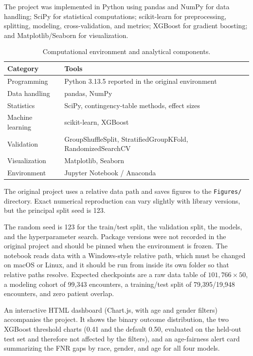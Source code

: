 \documentclass[10pt,a4paper]{article}
\begin{document}
The project was implemented in Python using pandas and NumPy for data handling; SciPy for statistical computations; scikit-learn for preprocessing, splitting, modeling, cross-validation, and metrics; XGBoost for gradient boosting; and Matplotlib/Seaborn for visualization.

\begin{table}[H]
\centering
\caption{Computational environment and analytical components.}
\label{tab:software}
\begin{tabularx}{\textwidth}{lY}
\toprule
Category & Tools\\
\midrule
Programming & Python 3.13.5 reported in the original environment\\
Data handling & pandas, NumPy\\
Statistics & SciPy, contingency-table methods, effect sizes\\
Machine learning & scikit-learn, XGBoost\\
Validation & GroupShuffleSplit, StratifiedGroupKFold, RandomizedSearchCV\\
Visualization & Matplotlib, Seaborn\\
Environment & Jupyter Notebook / Anaconda\\
\bottomrule
\end{tabularx}
\end{table}

The original project uses a relative data path and saves figures to the \texttt{Figures/} directory. Exact numerical reproduction can vary slightly with library versions, but the principal split seed is 123.

The random seed is 123 for the train/test split, the validation split, the models, and the hyperparameter search. Package versions were not recorded in the original project and should be pinned when the environment is frozen. The notebook reads data with a Windows-style relative path, which must be changed on macOS or Linux, and it should be run from inside its own folder so that relative paths resolve. Expected checkpoints are a raw data table of $101{,}766\times 50$, a modeling cohort of 99,343 encounters, a training/test split of 79,395/19,948 encounters, and zero patient overlap.

An interactive HTML dashboard (Chart.js, with age and gender filters) accompanies the project. It shows the binary outcome distribution, the two XGBoost threshold charts (0.41 and the default 0.50, evaluated on the held-out test set and therefore not affected by the filters), and an age-fairness alert card summarizing the FNR gaps by race, gender, and age for all four models.
\end{document}
